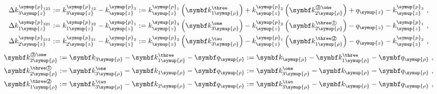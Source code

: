 \begin{subequations} \label{eq:2-247}
	\abovedisplayskip=0pt
	\belowdisplayskip=0pt
	\begin{align}
		\Delta k^{\symup{p}_{123}}_{3\symup{z}} &:= k^{\symup{p}_{12}}_{3\symup{z}} - k^{\symup{p}_{3}}_{\symup{z}} := k^{\symup{p}_{1}}_{\symup{z}} \left( \symbf k_{1\symup{\rho}}^{\text{\three}} \right) + k^{\symup{p}_{2}}_{\symup{z}} \left( \symbf k_{2\symup{\rho}}^{\text{\textcircled{3}\one}} \right) + q_{\symup{z}} - k^{\symup{p}_{3}}_{\symup{z}} \label{eq:2-247a}~, \\ \Delta k^{\symup{p}_{321}}_{1\symup{z}} &:= k^{\symup{p}_{32}}_{1\symup{z}} - k^{\symup{p}_{1}}_{\symup{z}} := k^{\symup{p}_{3}}_{\symup{z}} \left( \symbf k_{3\symup{\rho}}^\text{\one} \right) - k^{\symup{p}_{2}}_{\symup{z}} \left( \symbf k_{2\symup{\rho}}^{\text{\three\textcircled{1}}} \right) - q_{\symup{z}} - k^{\symup{p}_{1}}_{\symup{z}} \label{eq:2-247b}~, \\ \Delta k^{\symup{p}_{312}}_{2\symup{z}} &:= k^{\symup{p}_{31}}_{2\symup{z}} - k^{\symup{p}_{2}}_{\symup{z}} := k^{\symup{p}_{3}}_{\symup{z}} \left( \symbf k_{3\symup{\rho}}^\text{\two} \right) - k^{\symup{p}_{1}}_{\symup{z}} \left( \symbf k_{1\symup{\rho}}^{\text{\three\textcircled{2}}} \right) - q_{\symup{z}} - k^{\symup{p}_{2}}_{\symup{z}} \label{eq:2-247c}~,
	\end{align}
\end{subequations}
\begin{subequations} \label{eq:2-248}
	\abovedisplayskip=0pt
	\belowdisplayskip=0pt
	\begin{align}
		\symbf k_{2\symup{\rho}}^{\text{\textcircled{3}\one}} &:= \symbf k_{3\symup{\rho}} - \symbf k_{1\symup{\rho}}^{\text{\three}} - \symbf q_{\symup{\rho}} := \symbf k_{\symup{\rho}} - \symbf k_{1\symup{\rho}}^{\text{\three}} - \symbf q_{\symup{\rho}} \label{eq:2-248a}~, \\ \symbf k_{2\symup{\rho}}^{\text{\three\textcircled{1}}} &:= \symbf k_{3\symup{\rho}}^\text{\one} - \symbf k_{1\symup{\rho}} - \symbf q_{\symup{\rho}} := \symbf k_{3\symup{\rho}}^\text{\one} - \symbf k_{\symup{\rho}} - \symbf q_{\symup{\rho}} \label{eq:2-248b}~, \\ \symbf k_{1\symup{\rho}}^{\text{\three\textcircled{2}}} &:= \symbf k_{3\symup{\rho}}^\text{\two} - \symbf k_{2\symup{\rho}} - \symbf q_{\symup{\rho}} := \symbf k_{3\symup{\rho}}^\text{\two} - \symbf k_{\symup{\rho}} - \symbf q_{\symup{\rho}} \label{eq:2-248c}~, 
	\end{align}
\end{subequations}
